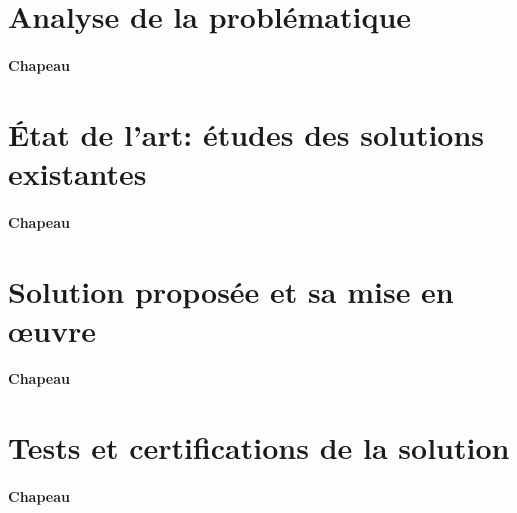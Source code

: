 \section{Analyse de la problématique} \label{sec:analyse1}

\paragraph{Chapeau}


\section{État de l’art: études des solutions existantes} \label{sec:etatDeLart1}

\paragraph{Chapeau}


\section{Solution proposée et sa mise en œuvre} \label{sec:solution1}

\paragraph{Chapeau}


\section{Tests et certifications de la solution} \label{sec:test1}

\paragraph{Chapeau}
